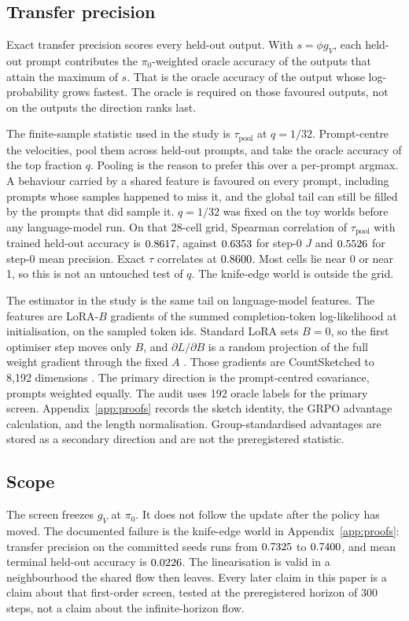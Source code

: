 \subsection{Transfer precision}

Exact transfer precision scores every held-out output.
With $s = \phi g_V$, each held-out prompt contributes the $\pi_0$-weighted oracle accuracy of the outputs that attain the maximum of $s$.
That is the oracle accuracy of the output whose log-probability grows fastest.
The oracle is required on those favoured outputs, not on the outputs the direction ranks last.

The finite-sample statistic used in the study is $\tau_{\mathrm{pool}}$ at $q = 1/32$.
Prompt-centre the velocities, pool them across held-out prompts, and take the oracle accuracy of the top fraction $q$.
Pooling is the reason to prefer this over a per-prompt argmax.
A behaviour carried by a shared feature is favoured on every prompt, including prompts whose samples happened to miss it, and the global tail can still be filled by the prompts that did sample it.
$q = 1/32$ was fixed on the toy worlds before any language-model run.
On that 28-cell grid, Spearman correlation of $\tau_{\mathrm{pool}}$ with trained held-out accuracy is $0.8617{}$, against $0.6353{}$ for step-0 $J$ and $0.5526{}$ for step-0 mean precision.
Exact $\tau$ correlates at $0.8600{}$.
Most cells lie near 0 or near 1, so this is not an untouched test of $q$.
The knife-edge world is outside the grid.

The estimator in the study is the same tail on language-model features.
The features are LoRA-$B$ gradients of the summed completion-token log-likelihood at initialisation, on the sampled token ids.
Standard LoRA sets $B = 0$, so the first optimiser step moves only $B$, and $\partial L / \partial B$ is a random projection of the full weight gradient through the fixed $A$ \citep{hu2021lora}.
Those gradients are CountSketched to 8,192 dimensions \citep{charikar2002frequent}.
The primary direction is the prompt-centred covariance, prompts weighted equally.
The audit uses 192 oracle labels for the primary screen.
Appendix~\ref{app:proofs} records the sketch identity, the GRPO advantage calculation, and the length normalisation.
Group-standardised advantages are stored as a secondary direction and are not the preregistered statistic.

\subsection{Scope}

The screen freezes $g_V$ at $\pi_0$.
It does not follow the update after the policy has moved.
The documented failure is the knife-edge world in Appendix~\ref{app:proofs}: transfer precision on the committed seeds runs from $0.7325{}$ to $0.7400{}$, and mean terminal held-out accuracy is $0.0226{}$.
The linearisation is valid in a neighbourhood the shared flow then leaves.
Every later claim in this paper is a claim about that first-order screen, tested at the preregistered horizon of 300 steps, not a claim about the infinite-horizon flow.

